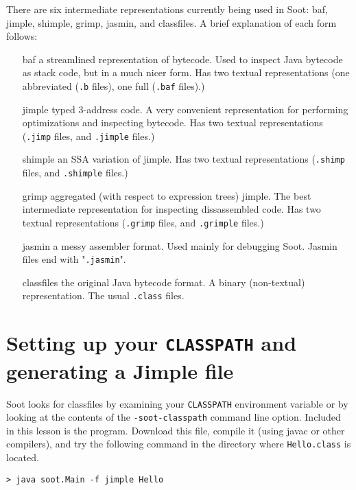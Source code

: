 \documentclass{article}
\begin{document}
There are six intermediate representations currently being used in Soot: baf,
jimple, shimple, grimp, jasmin, and classfiles.  A brief explanation of each form
follows:

\begin{enumerate}
\item[baf] a streamlined representation of bytecode.  Used to inspect Java
bytecode as stack code, but in a much nicer form.  Has two textual
representations (one abbreviated ({\tt .b} files), one full ({\tt .baf} 
files).)

\item[jimple] typed 3-address code.  A very convenient representation
for performing optimizations and inspecting bytecode.  Has two textual
representations ({\tt .jimp} files, and {\tt .jimple} files.)

\item[shimple] an SSA variation of jimple. Has two textual
representations ({\tt .shimp} files, and {\tt .shimple} files.)

\item[grimp] aggregated (with respect to expression trees) jimple.  The best
intermediate representation for inspecting dissassembled code. Has two textual
representations ({\tt .grimp} files, and {\tt .grimple} files.)

\item[jasmin] a messy assembler format.  Used mainly for debugging 
Soot.  Jasmin files end with "{\tt .jasmin}".

\item[classfiles] the original Java bytecode format.  A binary (non-textual)
representation.  The usual {\tt .class} files.
\end{enumerate}

\section{Setting up your {\tt CLASSPATH} and generating a Jimple file}

Soot looks for classfiles by examining your {\tt CLASSPATH} environment
variable or by looking at the contents of the {\tt -soot-classpath} command
line option.  Included in this lesson is the {} program.
Download this file, compile it (using javac or other compilers), and try the following
command in the directory where {\tt Hello.class} is located.

\begin{verbatim}
> java soot.Main -f jimple Hello
\end{verbatim}
\end{document}
